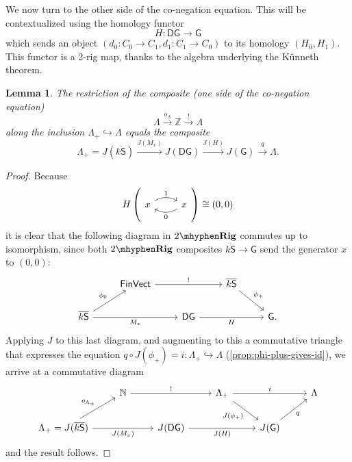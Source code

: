 \documentclass[12pt,reqno]{amsart}
\theoremstyle{plain}
\newtheorem{lem}[thm]{Lemma}
\theoremstyle{definition}
\theoremstyle{remark}
\newcommand{\maps}{\colon}
\newcommand{\category}[1]{\mathsf{#1}}
\renewcommand{\S}{\category S}
\newcommand{\Z}{\mathbb Z}
\newcommand{\namedcat}[1]{\mathsf{#1}}
\newcommand{\TRig}{2\mhyphen\namedbicat{Rig}}
\newcommand{\Vect}{\namedcat{Vect}}
\newcommand{\Fin}{\namedcat{Fin}}
\newcommand{\namedbicat}[1]{\mathbf{#1}}
\newcommand{\G}{\mathsf{G}} %
\newcommand{\DG}{\mathsf{DG}} %
\newcommand{\ksbar}{\overline{k\S}}
\numberwithin{thm}{section}
\begin{document}
We now turn to the other side  of the co-negation equation. This will be contextualized using the homology functor 
\[
    H \maps \DG \to \G
\]
which sends an object $(d_0 \maps C_0 \to C_1, d_1 \maps C_1 \to C_0)$ to its homology $(H_0, H_1)$. This functor is a 2-rig map, thanks to the algebra underlying the K\"unneth theorem.

\begin{lem}
\label{lem:reduction-four}
    The restriction of the composite (one side of the co-negation equation) 
    \[
    \Lambda \xrightarrow{o_\Lambda} \Z \xrightarrow{!} \Lambda
    \]
    along the inclusion $\Lambda_+ \hookrightarrow \Lambda$ equals the composite 
    \[
    \Lambda_+ = J(\ksbar) \xrightarrow{J(M_x)} J(\DG) \xrightarrow{J(H)} J(\G) \xrightarrow{q} \Lambda.
    \]
\end{lem}

\begin{proof}
    Because 
    \[
    H\left(\begin{tikzcd}
        x
        \arrow[r, bend left, "1"]
        &
        x
        \arrow[l, bend left, "0"]
    \end{tikzcd}\right) \cong (0, 0)
    \]
    it is clear that the following diagram in $\TRig$ commutes up to isomorphism, since both $\TRig$ composites $\ksbar \to \G$ send the generator $x$ to $(0, 0)$:
    \[
    \begin{tikzcd}
    &
    \Fin\Vect
    \arrow[rr, "!"]
    &&
    \ksbar
    \arrow[dr, "\phi_+"]
    \\
    \ksbar
    \arrow[ur, "\phi_0"]
    \arrow[rr, swap, "M_x"]
    &&
    \DG
    \arrow[rr, swap, "H"]
    &&
    \G. 
    \end{tikzcd}
    \]
    Applying $J$ to this last diagram, and augmenting to this a commutative triangle that expresses the equation $q \circ J(\phi_+) = i \maps \Lambda_+ \hookrightarrow \Lambda$ (\cref{prop:phi-plus-gives-id}), we arrive at a commutative diagram 
    \[
    \begin{tikzcd}
        &
        \mathbb{N}
        \arrow[rr, "!"]
        &&
        \Lambda_+ 
        \arrow[rr, "i"] 
        \arrow[dr, swap, "J(\phi_+)"]
        && 
        \Lambda
        \\
        \Lambda_+ = J(\ksbar)
        \arrow[ur, "o_{\Lambda_+}"]
        \arrow[rr, swap, "J(M_x)"]
        &&
        J(\DG)
        \arrow[rr, swap, "J(H)"]
        &&
        J(\G) \arrow[ur, swap, "q"]
    \end{tikzcd}
    \]
    and the result follows. 
\end{proof}
\end{document}
